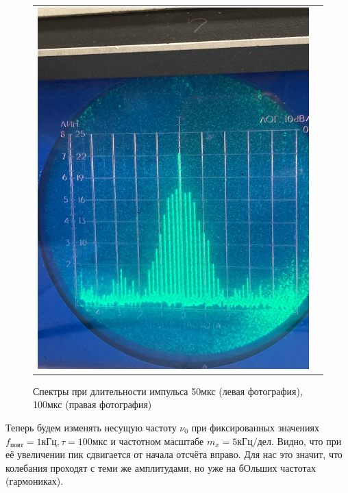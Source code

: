 \documentclass[a4paper, fontsize = 14pt]{article}
\begin{document}
\begin{figure}[hbt]
\begin{tabular}{cc}
\includegraphics[scale=0.3]{lab361ris4.png}
\end{tabular}
\caption{Спектры при длительности импульса 50мкс (левая фотография), 100мкс (правая фотография)}
\end{figure}

\newpage

Теперь будем изменять несущую частоту $\nu_0$ при фиксированных значениях $f_{повт} = 1 кГц, \tau = 100 мкс$ и частотном масштабе $m_x = 5 кГц/дел$. Видно, что при её увеличении пик сдвигается от начала отсчёта вправо. Для нас это значит, что колебания проходят с теми же амплитудами, но уже на бОльших частотах (гармониках).
\end{document}
